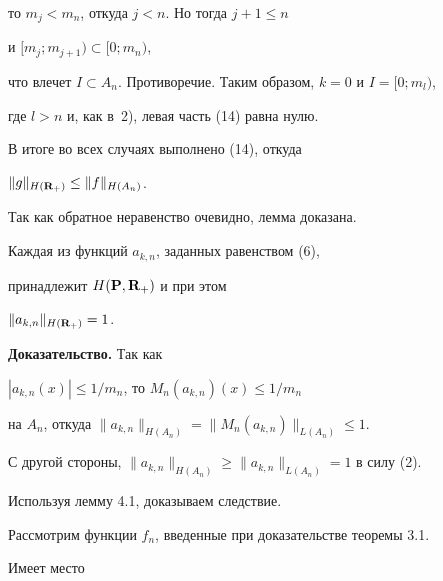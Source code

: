 то $m_j<m_n$, откуда $j<n$. Но тогда $j+1\leq n$


и $[m_j;m_{j+1})\subset[0;m_n)$, 


что влечет $I\subset A_n$. Противоречие. Таким образом, $k=0$ и $I=[0;m_l)$, 


где $l>n$ и, как в~2), левая часть (14) равна нулю.





В итоге во всех случаях выполнено (14), откуда


$\|g\|_{H({\bold R}_+)}\leq\|f\|_{H(A_n)}$. 


Так как обратное неравенство очевидно, лемма доказана.








\begin{cors}


Каждая из функций $a_{k,n}$, заданных равенством (6), 


принадлежит $H({\bold P},{\bold R}_+)$ и при этом


$\|a_{k,n}\|_{H({\bold R}_+)}=1$.


\end{cors}








{\bf Доказательство.} Так как


$|a_{k,n}(x)|\leq 1/m_n$, то $M_n(a_{k,n})(x)\leq 1/m_n$ 


на $A_n$, откуда $\|a_{k,n}\|_{H(A_n)}=\|M_n(a_{k,n})\|_{L(A_n)}\leq 1$.


С другой стороны, $\|a_{k,n}\|_{H(A_n)}\geq\|a_{k,n}\|_{L(A_n)}=1$ в силу (2). 


Используя лемму 4.1, доказываем следствие.





Рассмотрим функции $f_n$, введенные при доказательстве теоремы 3.1. 


Имеет место








